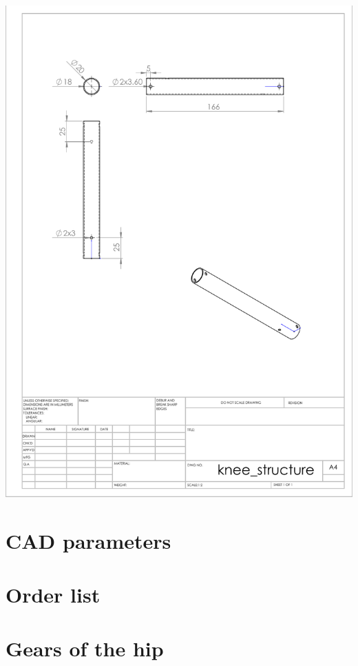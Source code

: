 \documentclass[12pt]{report}
\begin{document}
\begin{appendices}
            \includegraphics[width=\linewidth]{chapters/cha_appendices/knee_structure}

        \section{CAD parameters}
        \label{app:cad_parameters}
            

        \section{Order list}
        \label{app:order_list}
            

        \section{Gears of the hip}
        \label{app:hip_gears}
            
    \end{appendices}
\end{document}
